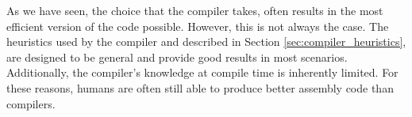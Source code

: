 

As we have seen, the choice that the compiler takes, often results in the most efficient version of the code possible. However, this is not always the case.
The heuristics used by the compiler and described in Section \ref{sec:compiler_heuristics}, are designed to be general and provide good results in most scenarios. Additionally, the compiler's knowledge at compile time is inherently limited. For these reasons, humans are often still able to produce better assembly code than compilers.


\newpage